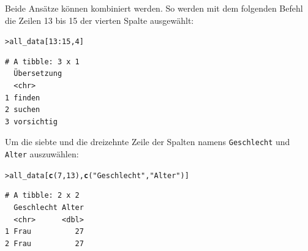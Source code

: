 \documentclass[oneside, 10pt]{book}\usepackage[]{graphicx}\usepackage[]{xcolor}
\makeatletter
\newcommand{\hlnum}[1]{\textcolor[rgb]{0.686,0.059,0.569}{#1}}%
\newcommand{\hlstr}[1]{\textcolor[rgb]{0.192,0.494,0.8}{#1}}%
\newcommand{\hlopt}[1]{\textcolor[rgb]{0,0,0}{#1}}%
\newcommand{\hlstd}[1]{\textcolor[rgb]{0.345,0.345,0.345}{#1}}%
\newcommand{\hlkwd}[1]{\textcolor[rgb]{0.737,0.353,0.396}{\textbf{#1}}}%
\newenvironment{kframe}{%
 \def\at@end@of@kframe{}%
 \ifinner\ifhmode%
  \def\at@end@of@kframe{\end{minipage}}%
  \begin{minipage}{\columnwidth}%
 \fi\fi%
 \def\FrameCommand##1{\hskip\@totalleftmargin \hskip-\fboxsep
 \colorbox{shadecolor}{##1}\hskip-\fboxsep
     \hskip-\linewidth \hskip-\@totalleftmargin \hskip\columnwidth}%
 \MakeFramed {\advance\hsize-\width
   \@totalleftmargin\z@ \linewidth\hsize
   \@setminipage}}%
 {\par\unskip\endMakeFramed%
 \at@end@of@kframe}
\newenvironment{knitrout}{}{} %
\makeatother
\begin{document}
Beide Ansätze können kombiniert werden. So werden mit dem folgenden
Befehl die Zeilen 13 bis 15 der vierten Spalte ausgewählt:
\begin{knitrout}
\color{fgcolor}\begin{kframe}
\begin{alltt}
\hlstd{> }\hlstd{all_data[}\hlnum{13}\hlopt{:}\hlnum{15}\hlstd{,} \hlnum{4}\hlstd{]}
\end{alltt}
\begin{verbatim}
# A tibble: 3 x 1
  Übersetzung
  <chr>      
1 finden     
2 suchen     
3 vorsichtig 
\end{verbatim}
\end{kframe}
\end{knitrout}
Um die siebte und die dreizehnte Zeile der Spalten namens \texttt{Geschlecht} und \texttt{Alter} auszuwählen:
\begin{knitrout}
\color{fgcolor}\begin{kframe}
\begin{alltt}
\hlstd{> }\hlstd{all_data[}\hlkwd{c}\hlstd{(}\hlnum{7}\hlstd{,} \hlnum{13}\hlstd{),} \hlkwd{c}\hlstd{(}\hlstr{"Geschlecht"}\hlstd{,} \hlstr{"Alter"}\hlstd{)]}
\end{alltt}
\begin{verbatim}
# A tibble: 2 x 2
  Geschlecht Alter
  <chr>      <dbl>
1 Frau          27
2 Frau          27
\end{verbatim}
\end{kframe}
\end{knitrout}
\end{document}
